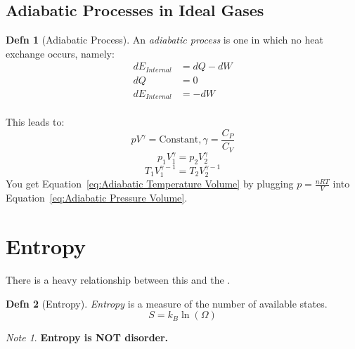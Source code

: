 \documentclass[10pt,letterpaper,final,twoside,notitlepage]{article}
\numberwithin{equation}{section} %
\theoremstyle{definition}
\newtheorem{definition}{Defn} %
\theoremstyle{remark}
\newtheorem{note}{Note}[definition] %
\begin{document}
	\subsection*{Adiabatic Processes in Ideal Gases} \label{subsec:Adiabatic Processes in Ideal Gases}
		\begin{definition}[Adiabatic Process] \label{def:Adiabatic Processes in Ideal Gases}
			An \emph{adiabatic process} is one in which no heat exchange occurs, namely:
			\begin{equation} \label{eq:Adiabatic Processes in Ideal Gases}
				\begin{aligned}
					dE_{Internal} &= dQ - dW \\
					dQ &= 0 \\
					dE_{Internal} &= -dW \\
				\end{aligned}
			\end{equation}
		\end{definition}
		This leads to:
		\begin{equation}
			pV^{\gamma} = \text{Constant}, \gamma = \frac{C_{P}}{C_{V}}
		\end{equation}
		\begin{equation} \label{eq:Adiabatic Pressure Volume}
			p_{1}V_{1}^{\gamma} = p_{2}V_{2}^{\gamma}
		\end{equation}
		\begin{equation} \label{eq:Adiabatic Temperature Volume}
			T_{1}V_{1}^{\gamma -1} = T_{2}V_{2}^{\gamma -1} 
		\end{equation}
		You get Equation~\eqref{eq:Adiabatic Temperature Volume} by plugging $p = \frac{nRT}{V}$ into Equation~\eqref{eq:Adiabatic Pressure Volume}.
		
\section{Entropy} \label{sec:Entropy}
There is a heavy relationship between this and the .
	\begin{definition}[Entropy] \label{def:Entropy}
		\emph{Entropy} is a measure of the number of available states.
		\begin{equation} \label{eq:Entropy}
			S = k_{B} \ln \left( \Omega \right)
		\end{equation}
		\begin{note}
			\textbf{Entropy is NOT disorder.}
		\end{note}
	\end{definition}
\end{document}
